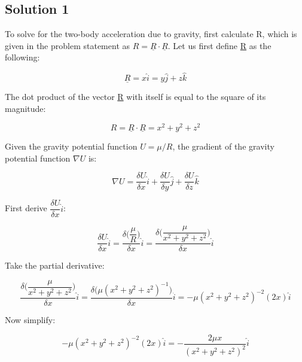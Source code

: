 \documentclass[conf]{new-aiaa}
\begin{document}
\subsection{Solution 1} 

To solve for the two-body acceleration due to gravity, first calculate R, which is given in the problem statement as $R = \underline{R} \cdot \underline{R}$. Let us first define \underline{R} as the following: 

\begin{equation}
\underline{R} = x \hat{i} = y \hat{j} + z \hat{k}
\end{equation}

The dot product of the vector \underline{R} with itself is equal to the square of its magnitude: 

\begin{equation}
R = \underline{R} \cdot \underline{R} = x^2 + y^2 + z^2
\end{equation}

Given the gravity potential function $U = \mu/R$, the gradient of the gravity potential function $ \nabla U $ is:

\begin{equation}
\nabla U = \frac{\delta U}{\delta x} \hat{i} + \frac{\delta U}{\delta y} \hat{j} + \frac{\delta U}{\delta z} \hat{k}  
\end{equation} 

First derive $\dfrac{\delta U}{\delta x} \hat{i}$: 

\begin{equation}
\frac{\delta U}{\delta x} \hat{i} = \dfrac{\delta \Big( \dfrac{\mu}{R} \Big) }{\delta x} \hat{i} = \dfrac{ \delta \Big( \dfrac{\mu}{x^2 + y^2 + z^2} \Big) }{\delta x} \hat{i}
\end{equation}

Take the partial derivative: 

\begin{equation}
\dfrac{ \delta \Big( \dfrac{\mu}{x^2 + y^2 + z^2} \Big) }{\delta x} \hat{i} = \dfrac{ \delta \big(\mu ( x^2 + y^2 + z^2 )^{-1} \big) }{\delta x} \hat{i} = -\mu ( x^2 + y^2 + z^2 )^{-2} ( 2x ) \hat{i}
\end{equation}

Now simplify: 

\begin{equation}
-\mu ( x^2 + y^2 + z^2 )^{-2} ( 2x ) \hat{i} = -\dfrac{2 \mu x}{ (x^2 + y^2 + z^2 )^2 } \hat{i}
\end{equation}
\end{document}
